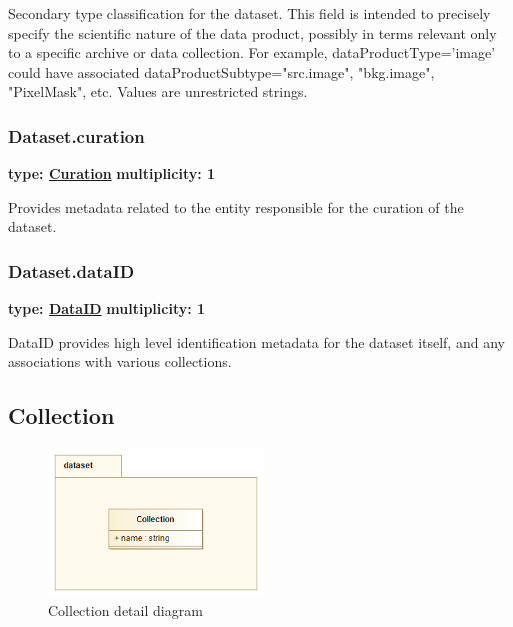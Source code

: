   Secondary type classification for the dataset. This field is intended to
  precisely specify the scientific nature of the data product, possibly in
  terms relevant only to a specific archive or data collection. For example,
  dataProductType='image' could have associated dataProductSubtype="src.image",
  "bkg.image", "PixelMask", etc. Values are unrestricted strings.
  
  \subsubsection{Dataset.curation}
  \textbf{type: \hyperref[sect:curation]{Curation}} \newline
  \textbf{multiplicity: 1} \newline 

  Provides metadata related to the entity responsible for the curation of the dataset.
  
  \subsubsection{Dataset.dataID}
  \textbf{type: \hyperref[sect:dataid]{DataID}} \newline
  \textbf{multiplicity: 1} \newline 

  DataID provides high level identification metadata for the dataset itself, and
  any associations with various collections.  
  
  
\pagebreak
\subsection{Collection}
\label{sect:collection}

  \begin{figure}[h]
  \begin{center}
    \includegraphics[width=2.25in]{diagrams/Collection.png}
    \caption{Collection detail diagram}\label{fig:collection}
  \end{center}
  \end{figure}

